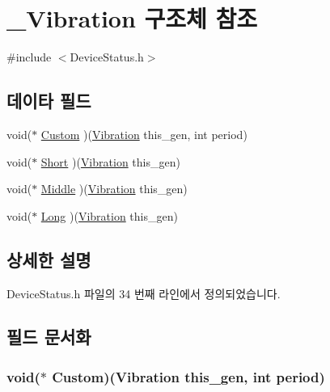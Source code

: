 \hypertarget{struct___vibration}{\section{\-\_\-\-Vibration 구조체 참조}
\label{struct___vibration}
}


{\ttfamily \#include $<$Device\-Status.\-h$>$}

\subsection*{데이타 필드}
\begin{DoxyCompactItemize}
\item 
void($\ast$ \hyperlink{struct___vibration_abc4c454bcd72f75161a47f4fde1fbf55}{Custom} )(\hyperlink{namespace_3global_scope_4_struct_vibration}{Vibration} this\-\_\-gen, int period)
\item 
void($\ast$ \hyperlink{struct___vibration_adba0d5d39af26335d9e3ee022750e763}{Short} )(\hyperlink{namespace_3global_scope_4_struct_vibration}{Vibration} this\-\_\-gen)
\item 
void($\ast$ \hyperlink{struct___vibration_a9d7417431ae33a9f09ca9eda0bb1ec0e}{Middle} )(\hyperlink{namespace_3global_scope_4_struct_vibration}{Vibration} this\-\_\-gen)
\item 
void($\ast$ \hyperlink{struct___vibration_a56bc06cfa0b7643653989b91d9524f46}{Long} )(\hyperlink{namespace_3global_scope_4_struct_vibration}{Vibration} this\-\_\-gen)
\end{DoxyCompactItemize}


\subsection{상세한 설명}


Device\-Status.\-h 파일의 34 번째 라인에서 정의되었습니다.



\subsection{필드 문서화}
\hypertarget{struct___vibration_abc4c454bcd72f75161a47f4fde1fbf55}{
\subsubsection[{Custom}]{\setlength{\rightskip}{0pt plus 5cm}void($\ast$  Custom)({\bf Vibration} this\-\_\-gen, int period)}}\label{struct___vibration_abc4c454bcd72f75161a47f4fde1fbf55}


